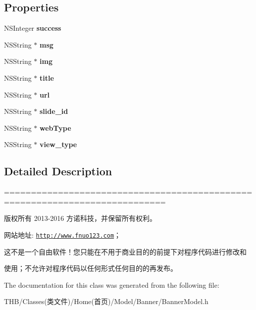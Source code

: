 \subsection*{Properties}
\begin{DoxyCompactItemize}
\item 
\mbox{\label{interface_banner_model_a9bbfc0c9986596fee15e2229ad96c40e}} 
N\+S\+Integer {\bfseries success}
\item 
\mbox{\label{interface_banner_model_a25ceb73ee008739b326d0e9b2841a3dc}} 
N\+S\+String $\ast$ {\bfseries msg}
\item 
\mbox{\label{interface_banner_model_a805ee8a303b9e713bda2622469515f5e}} 
N\+S\+String $\ast$ {\bfseries img}
\item 
\mbox{\label{interface_banner_model_aa7cf0b74389b3cdc12ac59424a912074}} 
N\+S\+String $\ast$ {\bfseries title}
\item 
\mbox{\label{interface_banner_model_ae9a39472937050e7c3e9fce008146c0a}} 
N\+S\+String $\ast$ {\bfseries url}
\item 
\mbox{\label{interface_banner_model_a5afcb19fb2d187b038137921e144c9fe}} 
N\+S\+String $\ast$ {\bfseries slide\+\_\+id}
\item 
\mbox{\label{interface_banner_model_a88a61d9b19dad53623b30601c6794dae}} 
N\+S\+String $\ast$ {\bfseries web\+Type}
\item 
\mbox{\label{interface_banner_model_a6c310637fb761b6f2f0329ae47ad233f}} 
N\+S\+String $\ast$ {\bfseries view\+\_\+type}
\end{DoxyCompactItemize}


\subsection{Detailed Description}
============================================================================

版权所有 2013-\/2016 方诺科技，并保留所有权利。

网站地址\+: \href{http://www.fnuo123.com}{\tt http\+://www.\+fnuo123.\+com}； 



这不是一个自由软件！您只能在不用于商业目的的前提下对程序代码进行修改和

使用；不允许对程序代码以任何形式任何目的的再发布。 

 

The documentation for this class was generated from the following file\+:\begin{DoxyCompactItemize}
\item 
T\+H\+B/\+Classes(类文件)/\+Home(首页)/\+Model/\+Banner/Banner\+Model.\+h\end{DoxyCompactItemize}
